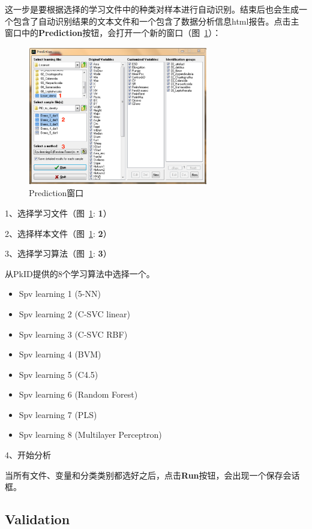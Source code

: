 \documentclass[12pt]{article}
\begin{document}
这一步是要根据选择的学习文件中的种类对样本进行自动识别。结束后也会生成一个包含了自动识别结果的文本文件和一个包含了数据分析信息html报告。点击主窗口中的\textbf{Prediction}按钮，会打开一个新的窗口（图~\ref{fig: PredictionWindow}）：

\begin{figure}[!ht]
\centering
\includegraphics[width=0.7\textwidth]{PredictionWindow.eps}
\caption{Prediction窗口}
\label{fig: PredictionWindow}
\end{figure}

1、选择学习文件（图~\ref{fig: PredictionWindow}: {\color{red}\textbf{1}}）

2、选择样本文件（图~\ref{fig: PredictionWindow}: {\color{red}\textbf{2}}）

3、选择学习算法（图~\ref{fig: PredictionWindow}: {\color{red}\textbf{3}}）

从PkID提供的8个学习算法中选择一个。
\begin{itemize}
\item Spv learning 1 (5-NN)
\item Spv learning 2 (C-SVC linear)
\item Spv learning 3 (C-SVC RBF)
\item Spv learning 4 (BVM)
\item Spv learning 5 (C4.5)
\item Spv learning 6 (Random Forest)
\item Spv learning 7 (PLS)
\item Spv learning 8 (Multilayer Perceptron)
\end{itemize}

4、开始分析

当所有文件、变量和分类类别都选好之后，点击\textbf{Run}按钮，会出现一个保存会话框。

\subsection{Validation}
\end{document}

